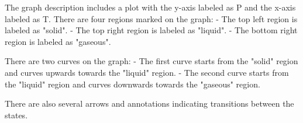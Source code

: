 The graph description includes a plot with the y-axis labeled as P and the x-axis labeled as T. There are four regions marked on the graph:
- The top left region is labeled as "solid".
- The top right region is labeled as "liquid".
- The bottom right region is labeled as "gaseous".

There are two curves on the graph:
- The first curve starts from the "solid" region and curves upwards towards the "liquid" region.
- The second curve starts from the "liquid" region and curves downwards towards the "gaseous" region.

There are also several arrows and annotations indicating transitions between the states.